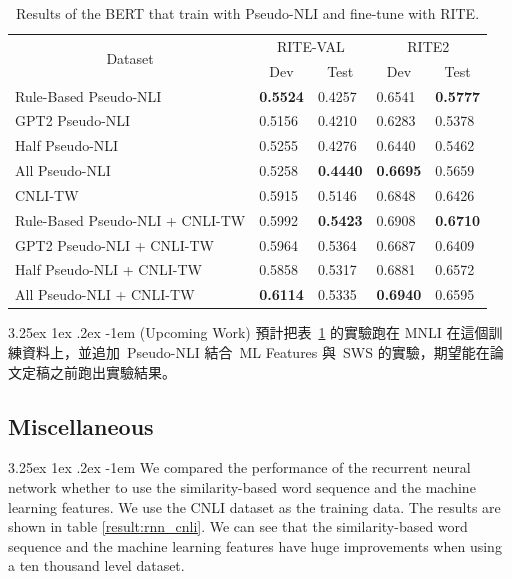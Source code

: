 \documentclass[12pt]{article}
\makeatletter
\renewcommand\paragraph{\@startsection{paragraph}{5}{\z@}%
  {3.25ex \@plus1ex \@minus.2ex}%
  {-1em}%
  {\normalfont\normalsize\bfseries}}
\makeatother
\begin{document}
\begin{CJK*}{UTF8}{bkai}
\begin{spacing}{1.77}
\begin{table}[H]
  \centering
  \setlength{\extrarowheight}{-3pt}
  \caption{Results of the BERT that train with Pseudo-NLI and fine-tune with RITE.}
  \label{result:pseudo_nli_bert}
  \begin{tabular}{|l|l|l|l|l|}
  \hline
  \multicolumn{1}{|c|}{\multirow{2}{*}{Dataset}} & \multicolumn{2}{c|}{RITE-VAL} & \multicolumn{2}{c|}{RITE2} \\ \cline{2-5}
  \multicolumn{1}{|c|}{} & \multicolumn{1}{c|}{Dev} & \multicolumn{1}{c|}{Test} & \multicolumn{1}{c|}{Dev} & \multicolumn{1}{c|}{Test} \\ \hline
  Rule-Based   Pseudo-NLI & \textbf{0.5524} & 0.4257 & 0.6541 & \textbf{0.5777} \\ \hline
  GPT2   Pseudo-NLI & 0.5156 & 0.4210 & 0.6283 & 0.5378 \\ \hline
  Half   Pseudo-NLI & 0.5255 & 0.4276 & 0.6440 & 0.5462 \\ \hline
  All   Pseudo-NLI & 0.5258 & \textbf{0.4440} & \textbf{0.6695} & 0.5659 \\ \hline \hline
  CNLI-TW & 0.5915 & 0.5146 & 0.6848 & 0.6426 \\ \hline
  Rule-Based   Pseudo-NLI + CNLI-TW & 0.5992 & \textbf{0.5423} & 0.6908 & \textbf{0.6710} \\ \hline
  GPT2   Pseudo-NLI + CNLI-TW & 0.5964 & 0.5364 & 0.6687 & 0.6409 \\ \hline
  Half   Pseudo-NLI + CNLI-TW & 0.5858 & 0.5317 & 0.6881 & 0.6572 \\ \hline
  All   Pseudo-NLI + CNLI-TW & \textbf{0.6114} & 0.5335 & \textbf{0.6940} & 0.6595 \\ \hline
  \end{tabular}
\end{table}

\paragraph{(Upcoming Work)}
預計把表\ \ref{result:pseudo_nli_bert} 的實驗跑在 MNLI 在這個訓練資料上，並追加\ Pseudo-NLI 結合\ ML Features 與\ SWS 的實驗，期望能在論文定稿之前跑出實驗結果。

\subsection{Miscellaneous}
\paragraph{}
We compared the performance of the recurrent neural network whether to use the similarity-based word sequence and the machine learning features. We use the CNLI dataset as the training data. The results are shown in table \ref{result:rnn_cnli}. We can see that the similarity-based word sequence and the machine learning features have huge improvements when using a ten thousand level dataset.


\end{spacing}
\end{CJK*}
\end{document}
